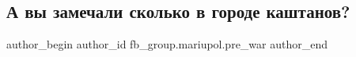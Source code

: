  
 
 
 
 

\subsection{А вы замечали сколько в городе каштанов?}
\label{sec:11_02_2023.fb.fb_group.mariupol.pre_war.7.a_vi_zamechali_skolk}

\ifcmt
 author_begin
   author_id fb_group.mariupol.pre_war
 author_end
\fi
